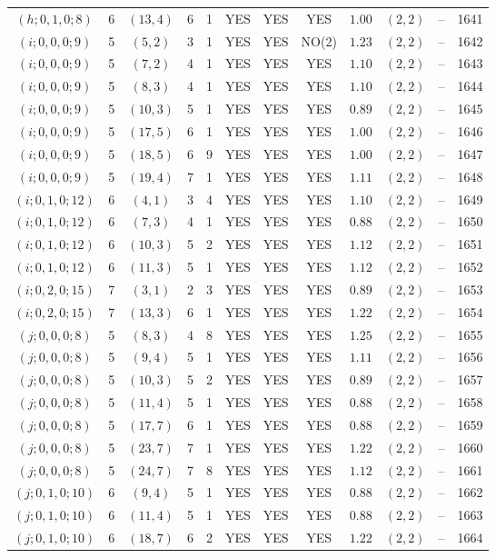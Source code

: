 \begin{longtable}{|c|c|c|c|c|c|c|c|c|c|c|c|}
$(h;0,1,0;8)$ & 6 & $(13,4)$ & 6 & 1 & YES & YES & YES & $1.00$ & $(2,2)$ & -- & 1641\\
$(i;0,0,0;9)$ & 5 & $(5,2)$ & 3 & 1 & YES & YES & NO(2) & $1.23$ & $(2,2)$ & -- & 1642\\
$(i;0,0,0;9)$ & 5 & $(7,2)$ & 4 & 1 & YES & YES & YES & $1.10$ & $(2,2)$ & -- & 1643\\
$(i;0,0,0;9)$ & 5 & $(8,3)$ & 4 & 1 & YES & YES & YES & $1.10$ & $(2,2)$ & -- & 1644\\
$(i;0,0,0;9)$ & 5 & $(10,3)$ & 5 & 1 & YES & YES & YES & $0.89$ & $(2,2)$ & -- & 1645\\
$(i;0,0,0;9)$ & 5 & $(17,5)$ & 6 & 1 & YES & YES & YES & $1.00$ & $(2,2)$ & -- & 1646\\
$(i;0,0,0;9)$ & 5 & $(18,5)$ & 6 & 9 & YES & YES & YES & $1.00$ & $(2,2)$ & -- & 1647\\
$(i;0,0,0;9)$ & 5 & $(19,4)$ & 7 & 1 & YES & YES & YES & $1.11$ & $(2,2)$ & -- & 1648\\
$(i;0,1,0;12)$ & 6 & $(4,1)$ & 3 & 4 & YES & YES & YES & $1.10$ & $(2,2)$ & -- & 1649\\
$(i;0,1,0;12)$ & 6 & $(7,3)$ & 4 & 1 & YES & YES & YES & $0.88$ & $(2,2)$ & -- & 1650\\
$(i;0,1,0;12)$ & 6 & $(10,3)$ & 5 & 2 & YES & YES & YES & $1.12$ & $(2,2)$ & -- & 1651\\
$(i;0,1,0;12)$ & 6 & $(11,3)$ & 5 & 1 & YES & YES & YES & $1.12$ & $(2,2)$ & -- & 1652\\
$(i;0,2,0;15)$ & 7 & $(3,1)$ & 2 & 3 & YES & YES & YES & $0.89$ & $(2,2)$ & -- & 1653\\
$(i;0,2,0;15)$ & 7 & $(13,3)$ & 6 & 1 & YES & YES & YES & $1.22$ & $(2,2)$ & -- & 1654\\
$(j;0,0,0;8)$ & 5 & $(8,3)$ & 4 & 8 & YES & YES & YES & $1.25$ & $(2,2)$ & -- & 1655\\
$(j;0,0,0;8)$ & 5 & $(9,4)$ & 5 & 1 & YES & YES & YES & $1.11$ & $(2,2)$ & -- & 1656\\
$(j;0,0,0;8)$ & 5 & $(10,3)$ & 5 & 2 & YES & YES & YES & $0.89$ & $(2,2)$ & -- & 1657\\
$(j;0,0,0;8)$ & 5 & $(11,4)$ & 5 & 1 & YES & YES & YES & $0.88$ & $(2,2)$ & -- & 1658\\
$(j;0,0,0;8)$ & 5 & $(17,7)$ & 6 & 1 & YES & YES & YES & $0.88$ & $(2,2)$ & -- & 1659\\
$(j;0,0,0;8)$ & 5 & $(23,7)$ & 7 & 1 & YES & YES & YES & $1.22$ & $(2,2)$ & -- & 1660\\
$(j;0,0,0;8)$ & 5 & $(24,7)$ & 7 & 8 & YES & YES & YES & $1.12$ & $(2,2)$ & -- & 1661\\
$(j;0,1,0;10)$ & 6 & $(9,4)$ & 5 & 1 & YES & YES & YES & $0.88$ & $(2,2)$ & -- & 1662\\
$(j;0,1,0;10)$ & 6 & $(11,4)$ & 5 & 1 & YES & YES & YES & $0.88$ & $(2,2)$ & -- & 1663\\
$(j;0,1,0;10)$ & 6 & $(18,7)$ & 6 & 2 & YES & YES & YES & $1.22$ & $(2,2)$ & -- & 1664
\end{longtable}
